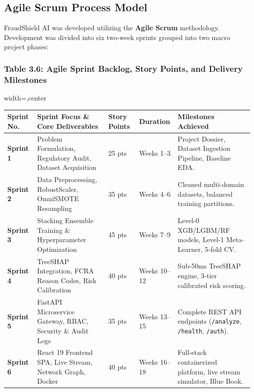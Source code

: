 \documentclass[12pt,a4paper,oneside]{report}
\begin{document}
\subsection{Agile Scrum Process Model}

FraudShield AI was developed utilizing the \textbf{Agile Scrum} methodology. Development was divided into six two-week sprints grouped into two macro project phases:


\subsubsection{Table 3.6: Agile Sprint Backlog, Story Points, and Delivery Milestones}

\begin{table}[H]
\centering
\footnotesize
\begin{adjustbox}{width=\textwidth,center}
\begin{tabular}{| l | l | l | l | l |}
\hline
\rowcolor{tableheader} \textbf{Sprint No.} & \textbf{Sprint Focus \& Core Deliverables} & \textbf{Story Points} & \textbf{Duration} & \textbf{Milestones Achieved} \\ \hline
\textbf{Sprint 1} & Problem Formulation, Regulatory Audit, Dataset Acquisition & 25 pts & Weeks 1--3 & Project Dossier, Dataset Ingestion Pipeline, Baseline EDA. \\ \hline
\rowcolor{tablealt} \textbf{Sprint 2} & Data Preprocessing, RobustScaler, OmniSMOTE Resampling & 35 pts & Weeks 4--6 & Cleaned multi-domain datasets, balanced training partitions. \\ \hline
\textbf{Sprint 3} & Stacking Ensemble Training \& Hyperparameter Optimization & 45 pts & Weeks 7--9 & Level-0 XGB/LGBM/RF models, Level-1 Meta-Learner, 5-fold CV. \\ \hline
\rowcolor{tablealt} \textbf{Sprint 4} & TreeSHAP Integration, FCRA Reason Codes, Risk Calibration & 40 pts & Weeks 10--12 & Sub-50ms TreeSHAP engine, 3-tier calibrated risk scoring. \\ \hline
\textbf{Sprint 5} & FastAPI Microservice Gateway, RBAC, Security \& Audit Logs & 35 pts & Weeks 13--15 & Complete REST API endpoints (\texttt{/analyze}, \texttt{/health}, \texttt{/auth}). \\ \hline
\rowcolor{tablealt} \textbf{Sprint 6} & React 19 Frontend SPA, Live Stream, Network Graph, Docker & 40 pts & Weeks 16--18 & Full-stack containerized platform, live stream simulator, Blue Book. \\ \hline
\end{tabular}
\end{adjustbox}
\end{table}
\end{document}

